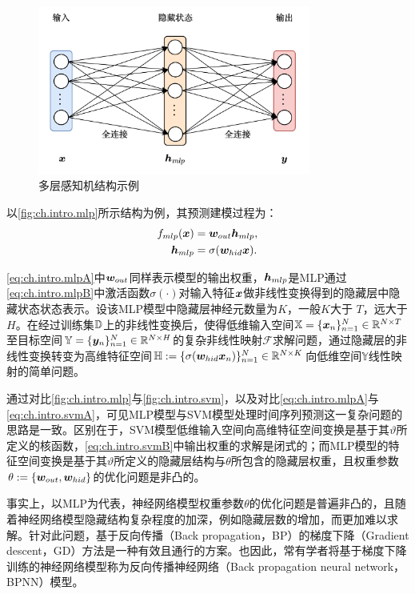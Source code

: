 \begin{figure}[t!]
    \centering
    \includegraphics[width=0.8\textwidth]{float/ch.intro/mlp.png}
    \caption{多层感知机结构示例\label{fig:ch.intro.mlp}}
\end{figure}

以\autoref{fig:ch.intro.mlp}所示结构为例，其预测建模过程为：
\begin{align}
    f_{mlp}(\bm{x}) &= \bm{w}_{out}\bm{h}_{mlp}, \label{eq:ch.intro.mlpA} \\
    \bm{h}_{mlp} &= \sigma (\bm{w}_{hid}\bm{x}).  \label{eq:ch.intro.mlpB} 
\end{align}

\autoref{eq:ch.intro.mlpA}中\(\bm{w}_{out}\)同样表示模型的输出权重，\(\bm{h}_{mlp}\)是MLP通过\autoref{eq:ch.intro.mlpB}中激活函数\(\sigma(\cdot)\)对输入特征\(\bm{x}\)做非线性变换得到的隐藏层中隐藏状态状态表示。设该MLP模型中隐藏层神经元数量为\(K\)，一般\(K\)大于 \(T\)，远大于\(H\)。在经过训练集\(\mathbb{D}\)上的非线性变换后，使得低维输入空间\(\mathbb{X} = \{\bm{x}_n\}_{n=1}^N \in \mathbb{R}^{N \times T}\)至目标空间\(\mathbb{Y} = \{\bm{y}_n\}_{n=1}^N \in \mathbb{R}^{N \times H}\)的复杂非线性映射\(\mathcal{F}\)求解问题，通过隐藏层的非线性变换转变为高维特征空间\(\mathbb{H} := \{\sigma (\bm{w}_{hid}\bm{x}_n)\}_{n=1}^N \in \mathbb{R}^{N \times K}\)向低维空间\(\mathbb{Y}\)线性映射的简单问题。

通过对比\autoref{fig:ch.intro.mlp}与\autoref{fig:ch.intro.svm}，以及对比\autoref{eq:ch.intro.mlpA}与\autoref{eq:ch.intro.svmA}，可见MLP模型与SVM模型处理时间序列预测这一复杂问题的思路是一致。区别在于，SVM模型低维输入空间向高维特征空间变换是基于其\(\vartheta\)所定义的核函数，\autoref{eq:ch.intro.svmB}中输出权重的求解是闭式的；而MLP模型的特征空间变换是基于其\(\vartheta\)所定义的隐藏层结构与\(\theta\)所包含的隐藏层权重，且权重参数\(\theta:=\{\bm{w}_{out},\bm{w}_{hid}\}\)的优化问题是非凸的。

事实上，以MLP为代表，神经网络模型权重参数\(\theta\)的优化问题是普遍非凸的，且随着神经网络模型隐藏结构复杂程度的加深，例如隐藏层数的增加，而更加难以求解。针对此问题，基于反向传播（Back propagation，BP）的梯度下降（Gradient descent，GD）方法是一种有效且通行的方案。也因此，常有学者将基于梯度下降训练的神经网络模型称为反向传播神经网络（Back propagation neural network，BPNN）模型\cite{wangBack2015,wongTime1991,wangForecasting2011,dongSmall2018}。

